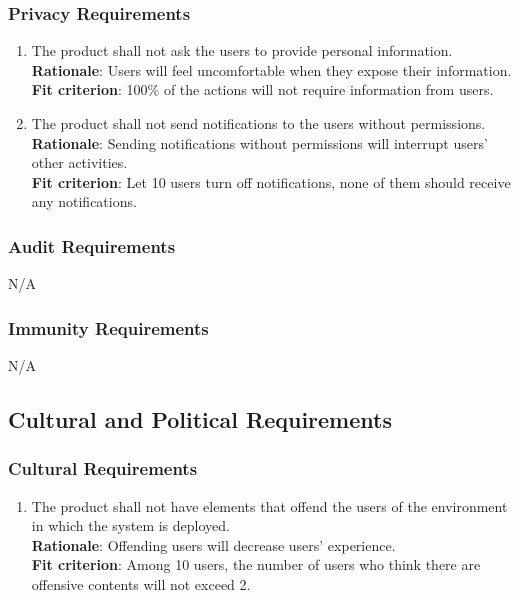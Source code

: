 \documentclass{article}
\begin{document}
\subsubsection{Privacy Requirements}
\begin{enumerate}[SR3.1]
    \item The product shall not ask the users to provide personal information.\\
    \textbf{Rationale}: Users will feel uncomfortable when they expose their information.\\
    \textbf{Fit criterion}: 100\% of the actions will not require information from users.
    \item The product shall not send notifications to the users 
    without permissions.\\
    \textbf{Rationale}: Sending notifications without permissions will
    interrupt users' other activities.\\
    \textbf{Fit criterion}: Let 10 users turn off notifications, none of
    them should receive any notifications.\\
\end{enumerate}
\subsubsection{Audit Requirements}
 N/A

\subsubsection{Immunity Requirements}
N/A
\subsection{Cultural and Political Requirements}
\subsubsection{Cultural Requirements}
\begin{enumerate}[CP1.1]
    \item The product shall not have elements that offend the users of the environment in which the system is deployed.\\
    \textbf{Rationale}: Offending users will decrease users' experience.\\
    \textbf{Fit criterion}: Among 10 users, the number of users who think there are offensive contents will not exceed 2.\\
\end{enumerate}
\end{document}
